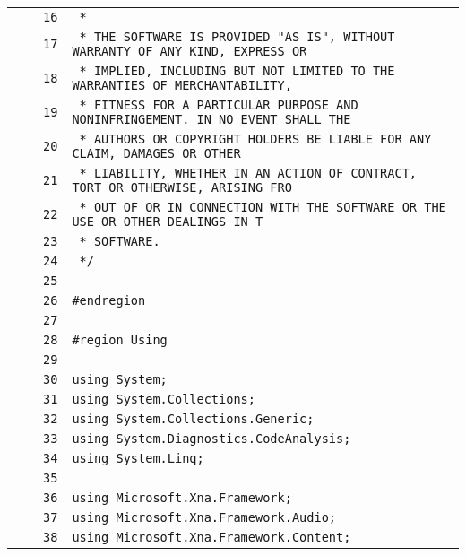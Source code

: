 \documentclass[a4paper,10pt]{article}
\begin{document}
\begin{longtable}[l]{lrrl}
\cellcolor{gray} &  & \verb~16~ & \verb~ *~\\
\cellcolor{gray} &  & \verb~17~ & \verb~ * THE SOFTWARE IS PROVIDED "AS IS", WITHOUT WARRANTY OF ANY KIND, EXPRESS OR~\\
\cellcolor{gray} &  & \verb~18~ & \verb~ * IMPLIED, INCLUDING BUT NOT LIMITED TO THE WARRANTIES OF MERCHANTABILITY,~\\
\cellcolor{gray} &  & \verb~19~ & \verb~ * FITNESS FOR A PARTICULAR PURPOSE AND NONINFRINGEMENT. IN NO EVENT SHALL THE~\\
\cellcolor{gray} &  & \verb~20~ & \verb~ * AUTHORS OR COPYRIGHT HOLDERS BE LIABLE FOR ANY CLAIM, DAMAGES OR OTHER~\\
\cellcolor{gray} &  & \verb~21~ & \verb~ * LIABILITY, WHETHER IN AN ACTION OF CONTRACT, TORT OR OTHERWISE, ARISING FRO~\\
\cellcolor{gray} &  & \verb~22~ & \verb~ * OUT OF OR IN CONNECTION WITH THE SOFTWARE OR THE USE OR OTHER DEALINGS IN T~\\
\cellcolor{gray} &  & \verb~23~ & \verb~ * SOFTWARE.~\\
\cellcolor{gray} &  & \verb~24~ & \verb~ */~\\
\cellcolor{gray} &  & \verb~25~ & \verb~~\\
\cellcolor{gray} &  & \verb~26~ & \verb~#endregion~\\
\cellcolor{gray} &  & \verb~27~ & \verb~~\\
\cellcolor{gray} &  & \verb~28~ & \verb~#region Using~\\
\cellcolor{gray} &  & \verb~29~ & \verb~~\\
\cellcolor{gray} &  & \verb~30~ & \verb~using System;~\\
\cellcolor{gray} &  & \verb~31~ & \verb~using System.Collections;~\\
\cellcolor{gray} &  & \verb~32~ & \verb~using System.Collections.Generic;~\\
\cellcolor{gray} &  & \verb~33~ & \verb~using System.Diagnostics.CodeAnalysis;~\\
\cellcolor{gray} &  & \verb~34~ & \verb~using System.Linq;~\\
\cellcolor{gray} &  & \verb~35~ & \verb~~\\
\cellcolor{gray} &  & \verb~36~ & \verb~using Microsoft.Xna.Framework;~\\
\cellcolor{gray} &  & \verb~37~ & \verb~using Microsoft.Xna.Framework.Audio;~\\
\cellcolor{gray} &  & \verb~38~ & \verb~using Microsoft.Xna.Framework.Content;~\\

\end{longtable}
\end{document}
